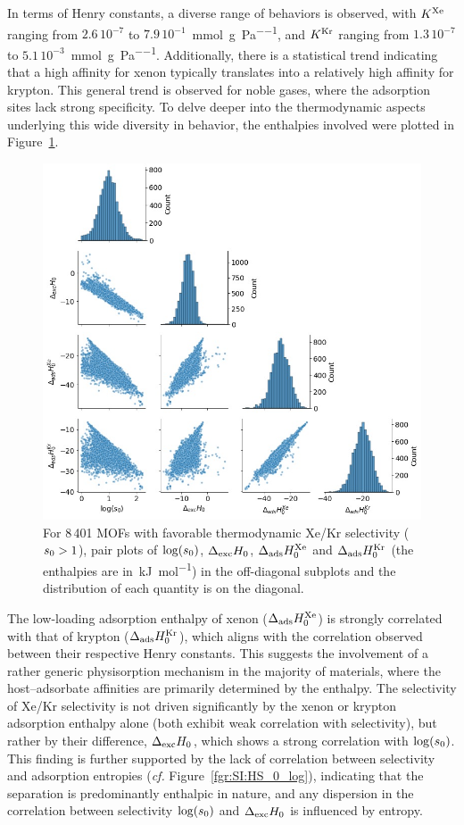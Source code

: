 \documentclass[main.tex]{subfiles}
\begin{document}
In terms of Henry constants, a diverse range of behaviors is observed, with $K^{\text{Xe}}$ ranging from $2.6\,10^{-7}$ to $7.9\,10^{-1}$~\si{\milli\mole\per\gram\per\pascal}, and $K^{\text{Kr}}$ ranging from $1.3\,10^{-7}$ to $5.1\,10^{-3}$~\si{\milli\mole\per\gram\per\pascal}.  Additionally, there is a statistical trend indicating that a high affinity for xenon typically translates into a relatively high affinity for krypton. This general trend is observed for noble gases, where the adsorption sites lack strong specificity. To delve deeper into the thermodynamic aspects underlying this wide diversity in behavior, the enthalpies involved were plotted in Figure~\ref{fgr:histo_H}.

\begin{figure}[t]
\centering
  \includegraphics[width=0.7\linewidth]{figures/2-thermo/Enthalpy_0_log.jpg}
  \caption{For 8\,401 MOFs with favorable thermodynamic Xe/Kr selectivity ($s_{\text{0}} > 1$), pair plots of $\log(s_{\text{0}})$, $\Delta_{\text{exc}}H_{\text{0}}$, $\Delta_{\text{ads}}H^{\text{Xe}}_{\text{0}}$ and $\Delta_{\text{ads}}H^{\text{Kr}}_{\text{0}}$ (the enthalpies are in~\si{\kilo\joule\per\mol}) in the off-diagonal subplots and the distribution of each quantity is on the diagonal.}\label{fgr:histo_H}
\end{figure}

The low-loading adsorption enthalpy of xenon ($\Delta_{\text{ads}}H^{\text{Xe}}_{\text{0}}$) is strongly correlated with that of krypton ($\Delta_{\text{ads}}H^{\text{Kr}}_{\text{0}}$), which aligns with the correlation observed between their respective Henry constants. This suggests the involvement of a rather generic physisorption mechanism in the majority of materials, where the host--adsorbate affinities are primarily determined by the enthalpy. The selectivity of Xe/Kr selectivity is not driven significantly by the xenon or krypton adsorption enthalpy alone (both exhibit weak correlation with selectivity), but rather by their difference, $\Delta_{\text{exc}}H_{\text{0}}$, which shows a strong correlation with $\log(s_{\text{0}})$. This finding is further supported by the lack of correlation between selectivity and adsorption entropies (\emph{cf.} Figure~\ref{fgr:SI:HS_0_log}), indicating that the separation is predominantly enthalpic in nature, and any dispersion in the correlation between selectivity $\log(s_{\text{0}})$ and $\Delta_{\text{exc}}H_{\text{0}}$ is influenced by entropy.
\end{document}
